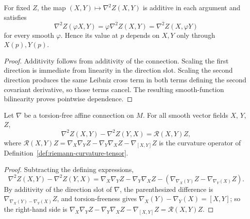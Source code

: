 \begin{lemma}
\label{lem:second-covariant-derivative-tensorial}




For fixed $Z$, the map $(X,Y)\mapsto\nabla^2Z(X,Y)$ is additive in
each argument and satisfies
\[
  \nabla^2Z(\varphi X,Y)=\varphi\nabla^2Z(X,Y)
  =\nabla^2Z(X,\varphi Y)
\]
for every smooth $\varphi$. Hence its value at $p$ depends on $X,Y$
only through $X(p),Y(p)$.
\end{lemma}

\begin{proof}
\sketch
{}

Additivity follows from additivity of the connection. Scaling the first direction is immediate from linearity in the direction slot. Scaling the second direction produces the same Leibniz cross term in both terms defining the second covariant derivative, so those terms cancel. The resulting smooth-function bilinearity proves pointwise dependence.
\end{proof}

\begin{lemma}
\label{lem:ricci-commutation-vector-field}





Let $\nabla$ be a torsion-free affine connection on $M$. For all
smooth vector fields $X$, $Y$, $Z$,
$$\nabla^2Z(X,Y)-\nabla^2Z(Y,X)={\mathcal R}(X,Y)Z,$$
where ${\mathcal R}(X,Y)Z
=\nabla_X\nabla_YZ-\nabla_Y\nabla_XZ-\nabla_{[X,Y]}Z$ is the
curvature operator of Definition~\ref{def:riemann-curvature-tensor}.
\end{lemma}

\begin{proof}
\sketch
{}

Subtracting the defining expressions,
$$\nabla^2Z(X,Y)-\nabla^2Z(Y,X)
=\nabla_X\nabla_YZ-\nabla_Y\nabla_XZ
-\left(\nabla_{\nabla_X(Y)}Z-\nabla_{\nabla_Y(X)}Z\right).$$
By additivity of the direction slot of $\nabla$, the parenthesized
difference is $\nabla_{\nabla_X(Y)-\nabla_Y(X)}Z$, and
torsion-freeness gives $\nabla_X(Y)-\nabla_Y(X)=[X,Y]$; so the
right-hand side is
$\nabla_X\nabla_YZ-\nabla_Y\nabla_XZ-\nabla_{[X,Y]}Z
={\mathcal R}(X,Y)Z$.
\end{proof}

